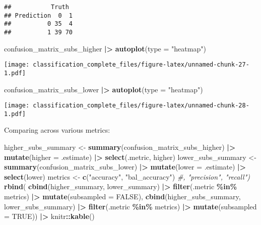 \documentclass[
]{article}
\newenvironment{Shaded}{\begin{snugshade}}{\end{snugshade}}
\newcommand{\AttributeTok}[1]{\textcolor[rgb]{0.13,0.29,0.53}{#1}}
\newcommand{\CommentTok}[1]{\textcolor[rgb]{0.56,0.35,0.01}{\textit{#1}}}
\newcommand{\ConstantTok}[1]{\textcolor[rgb]{0.56,0.35,0.01}{#1}}
\newcommand{\FunctionTok}[1]{\textcolor[rgb]{0.13,0.29,0.53}{\textbf{#1}}}
\newcommand{\NormalTok}[1]{#1}
\newcommand{\OtherTok}[1]{\textcolor[rgb]{0.56,0.35,0.01}{#1}}
\newcommand{\SpecialCharTok}[1]{\textcolor[rgb]{0.81,0.36,0.00}{\textbf{#1}}}
\newcommand{\StringTok}[1]{\textcolor[rgb]{0.31,0.60,0.02}{#1}}
\begin{document}
\begin{verbatim}
##           Truth
## Prediction  0  1
##          0 35  4
##          1 39 70
\end{verbatim}

\begin{Shaded}
\begin{Highlighting}[]
\NormalTok{confusion\_matrix\_subs\_higher }\SpecialCharTok{|\textgreater{}} \FunctionTok{autoplot}\NormalTok{(}\AttributeTok{type =} \StringTok{"heatmap"}\NormalTok{)}
\end{Highlighting}
\end{Shaded}

\texttt{[image: classification\_complete\_files/figure-latex/unnamed-chunk-27-1.pdf]}

\begin{Shaded}
\begin{Highlighting}[]
\NormalTok{confusion\_matrix\_subs\_lower }\SpecialCharTok{|\textgreater{}} \FunctionTok{autoplot}\NormalTok{(}\AttributeTok{type =} \StringTok{"heatmap"}\NormalTok{)}
\end{Highlighting}
\end{Shaded}

\texttt{[image: classification\_complete\_files/figure-latex/unnamed-chunk-28-1.pdf]}

Comparing across various metrics:

\begin{Shaded}
\begin{Highlighting}[]
\NormalTok{higher\_subs\_summary }\OtherTok{\textless{}{-}} \FunctionTok{summary}\NormalTok{(confusion\_matrix\_subs\_higher) }\SpecialCharTok{|\textgreater{}}
  \FunctionTok{mutate}\NormalTok{(}\AttributeTok{higher =}\NormalTok{ .estimate) }\SpecialCharTok{|\textgreater{}}
  \FunctionTok{select}\NormalTok{(.metric, higher)}
\NormalTok{lower\_subs\_summary }\OtherTok{\textless{}{-}} \FunctionTok{summary}\NormalTok{(confusion\_matrix\_subs\_lower) }\SpecialCharTok{|\textgreater{}}
  \FunctionTok{mutate}\NormalTok{(}\AttributeTok{lower =}\NormalTok{ .estimate) }\SpecialCharTok{|\textgreater{}}
  \FunctionTok{select}\NormalTok{(lower)}
\NormalTok{metrics }\OtherTok{\textless{}{-}} \FunctionTok{c}\NormalTok{(}\StringTok{"accuracy"}\NormalTok{, }\StringTok{"bal\_accuracy"}\NormalTok{) }\CommentTok{\#, "precision", "recall")}
\FunctionTok{rbind}\NormalTok{(}
\FunctionTok{cbind}\NormalTok{(higher\_summary, lower\_summary) }\SpecialCharTok{|\textgreater{}}
  \FunctionTok{filter}\NormalTok{(.metric }\SpecialCharTok{\%in\%}\NormalTok{ metrics) }\SpecialCharTok{|\textgreater{}}
  \FunctionTok{mutate}\NormalTok{(}\AttributeTok{subsampled =} \ConstantTok{FALSE}\NormalTok{),}
\FunctionTok{cbind}\NormalTok{(higher\_subs\_summary, lower\_subs\_summary) }\SpecialCharTok{|\textgreater{}}
  \FunctionTok{filter}\NormalTok{(.metric }\SpecialCharTok{\%in\%}\NormalTok{ metrics) }\SpecialCharTok{|\textgreater{}}
  \FunctionTok{mutate}\NormalTok{(}\AttributeTok{subsampled =} \ConstantTok{TRUE}\NormalTok{)) }\SpecialCharTok{|\textgreater{}}
\NormalTok{  knitr}\SpecialCharTok{::}\FunctionTok{kable}\NormalTok{()}
\end{Highlighting}
\end{Shaded}
\end{document}
